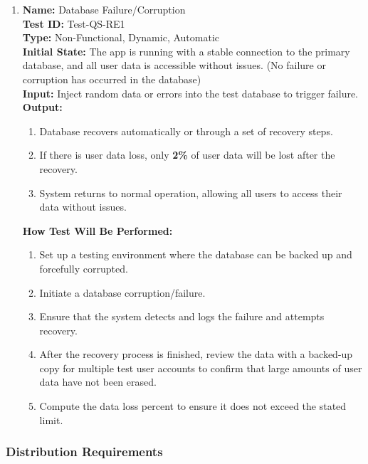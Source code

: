 \documentclass[12pt, titlepage]{article}
\begin{document}
\begin{enumerate}

  \item \textbf{Name:} Database Failure/Corruption \label{itm:Test-QS-RE1} \\
  \textbf{Test ID:} Test-QS-RE1 \\
  \textbf{Type:} Non-Functional, Dynamic, Automatic \\
  \textbf{Initial State:} The app is running with a stable connection to the primary database, and all user data is accessible without issues. (No failure or corruption has occurred in the database) \\
  \textbf{Input:} Inject random data or errors into the test database to trigger failure. \\
  \textbf{Output:}
  \begin{enumerate}
      \item Database recovers automatically or through a set of recovery steps.
      \item If there is user data loss, only \textbf{2\%} of user data will be lost after the recovery.
      \item System returns to normal operation, allowing all users to access their data without issues.
  \end{enumerate}
  \textbf{How Test Will Be Performed:}
  \begin{enumerate}
      \item Set up a testing environment where the database can be backed up and forcefully corrupted.
      \item Initiate a database corruption/failure.
      \item Ensure that the system detects and logs the failure and attempts recovery.
      \item After the recovery process is finished, review the data with a backed-up copy for multiple test user accounts to confirm that large amounts of user data have not been erased.
      \item Compute the data loss percent to ensure it does not exceed the stated limit.
  \end{enumerate}

\end{enumerate}

\subsubsection{Distribution Requirements}
\end{document}
